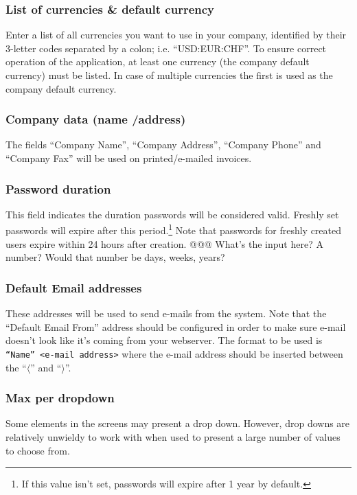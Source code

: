 \subsubsection{List of currencies \& default currency}

Enter a list of all currencies you want
to use in your company, identified by their 3-letter codes separated by a colon; i.e.
``USD:EUR:CHF''. To ensure correct operation of the application, at least one currency
(the company default currency) must be listed. In case of multiple currencies the first
is used as the company default currency.
\subsubsection{Company data (name /address)}

The fields ``Company Name'', ``Company Address'',
``Company Phone'' and ``Company Fax'' will be used on printed/e-mailed invoices.

\subsubsection{Password duration} This field indicates the duration passwords will be considered valid. Freshly set passwords will expire after this period.\footnote{If this value isn't set, passwords will expire after 1 year by default.} Note that passwords for freshly
created users expire within 24 hours after creation. @@@ What's the input here? A number? Would that number be days, weeks, years?


\subsubsection{Default Email addresses}

These addresses will be used to send e-mails from the system.
Note that the ``Default Email From'' address should be configured in order to make sure
e-mail doesn't look like it's coming from your webserver. The format to be used is \texttt{``Name'' <e-mail address>} where the e-mail address should be inserted between the
``$\langle$'' and ``$\rangle$''.

\subsubsection{Max per dropdown}

Some elements in the screens may present a drop down. However, drop downs are
relatively unwieldy to work with when used to present a large number of values
to choose from.

